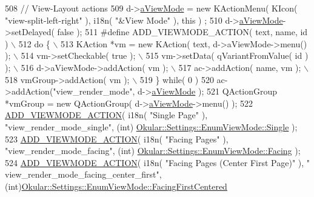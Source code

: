 \begin{DoxyCode}
{508     \textcolor{comment}{// View-Layout actions}
509     d->\hyperlink{classPageViewPrivate_a89d998dea21b24010b2578c6b4f5d9d2}{aViewMode} = \textcolor{keyword}{new} KActionMenu( KIcon( \textcolor{stringliteral}{"view-split-left-right"} ), i18n( \textcolor{stringliteral}{"&View Mode"} ), \textcolor{keyword}{this} )
      ;
510     d->\hyperlink{classPageViewPrivate_a89d998dea21b24010b2578c6b4f5d9d2}{aViewMode}->setDelayed( \textcolor{keyword}{false} );
511 \textcolor{preprocessor}{#define ADD\_VIEWMODE\_ACTION( text, name, id ) \(\backslash\)}
512 \textcolor{preprocessor}{do \{ \(\backslash\)}
513 \textcolor{preprocessor}{    KAction *vm = new KAction( text, d->aViewMode->menu() ); \(\backslash\)}
514 \textcolor{preprocessor}{    vm->setCheckable( true ); \(\backslash\)}
515 \textcolor{preprocessor}{    vm->setData( qVariantFromValue( id ) ); \(\backslash\)}
516 \textcolor{preprocessor}{    d->aViewMode->addAction( vm ); \(\backslash\)}
517 \textcolor{preprocessor}{    ac->addAction( name, vm ); \(\backslash\)}
518 \textcolor{preprocessor}{    vmGroup->addAction( vm ); \(\backslash\)}
519 \textcolor{preprocessor}{\} while( 0 )}
520     ac->addAction(\textcolor{stringliteral}{"view\_render\_mode"}, d->\hyperlink{classPageViewPrivate_a89d998dea21b24010b2578c6b4f5d9d2}{aViewMode} );
521     QActionGroup *vmGroup = \textcolor{keyword}{new} QActionGroup( d->\hyperlink{classPageViewPrivate_a89d998dea21b24010b2578c6b4f5d9d2}{aViewMode}->menu() );
522     \hyperlink{pageview_8cpp_a4cec0467f9d945fd6a0027c3c339c725}{ADD\_VIEWMODE\_ACTION}( i18n( \textcolor{stringliteral}{"Single Page"} ), \textcolor{stringliteral}{"view\_render\_mode\_single"}, (\textcolor{keywordtype}{int})
      \hyperlink{classOkular_1_1Settings_1_1EnumViewMode_a33bc89b0f0c02bd5539bad916569a665a7ae89daa45516a7920bf5ee4f15c8d27}{Okular::Settings::EnumViewMode::Single} );
523     \hyperlink{pageview_8cpp_a4cec0467f9d945fd6a0027c3c339c725}{ADD\_VIEWMODE\_ACTION}( i18n( \textcolor{stringliteral}{"Facing Pages"} ), \textcolor{stringliteral}{"view\_render\_mode\_facing"}, (\textcolor{keywordtype}{int})
      \hyperlink{classOkular_1_1Settings_1_1EnumViewMode_a33bc89b0f0c02bd5539bad916569a665ad6ce5fe491499be5fc070b0364e24287}{Okular::Settings::EnumViewMode::Facing} );
524     \hyperlink{pageview_8cpp_a4cec0467f9d945fd6a0027c3c339c725}{ADD\_VIEWMODE\_ACTION}( i18n( \textcolor{stringliteral}{"Facing Pages (Center First Page)"} ), \textcolor{stringliteral}{"
      view\_render\_mode\_facing\_center\_first"}, (\textcolor{keywordtype}{int})\hyperlink{classOkular_1_1Settings_1_1EnumViewMode_a33bc89b0f0c02bd5539bad916569a665a9c6afefcdc8d9a813c22e4492a8eecfb}{Okular::Settings::EnumViewMode::FacingFirstCentered}
}
\end{DoxyCode}
